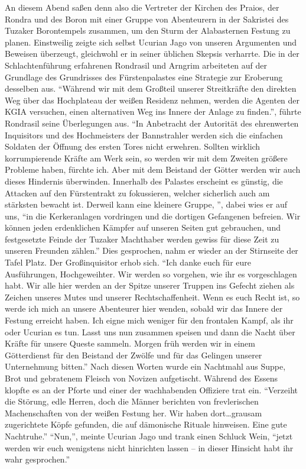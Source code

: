 An diesem Abend saßen denn also die Vertreter der Kirchen des Praios, der Rondra und des Boron mit einer Gruppe von Abenteurern in der Sakristei des Tuzaker Borontempels zusammen, um den Sturm der Alabasternen Festung zu planen. Einstweilig zeigte sich selbst Ucurian Jago von unseren Argumenten und Beweisen überzeugt, gleichwohl er in seiner üblichen Skepsis verharrte. Die in der Schlachtenführung erfahrenen Rondrasil und Arngrim arbeiteten auf der Grundlage des Grundrisses des Fürstenpalastes eine Strategie zur Eroberung desselben aus. ``Während wir mit dem Großteil unserer Streitkräfte den direkten Weg über das Hochplateau der weißen Residenz nehmen, werden die Agenten der KGIA versuchen, einen alternativen Weg ins Innere der Anlage zu finden.'', führte Rondrasil seine Überlegungen aus. ``In Anbetracht der Autorität des ehrenwerten Inquisitors und des Hochmeisters der Bannstrahler werden sich die einfachen Soldaten der Öffnung des ersten Tores nicht erwehren. Sollten wirklich korrumpierende Kräfte am Werk sein, so werden wir mit dem Zweiten größere Probleme haben, fürchte ich. Aber mit dem Beistand der Götter werden wir auch dieses Hindernis überwinden. Innerhalb des Palastes erscheint es günstig, die Attacken auf den Fürstentrakt zu fokussieren, welcher sicherlich auch am stärksten bewacht ist. Derweil kann eine kleinere Gruppe, '', dabei wies er auf uns, ``in die Kerkeranlagen vordringen und die dortigen Gefangenen befreien. Wir können jeden erdenklichen Kämpfer auf unseren Seiten gut gebrauchen, und festgesetzte Feinde der Tuzaker Machthaber werden gewiss für diese Zeit zu unseren Freunden zählen.'' Dies gesprochen, nahm er wieder an der Stirnseite der Tafel Platz. Der Großinquisitor erhob sich. ``Ich danke euch für eure Ausführungen, Hochgeweihter. Wir werden so vorgehen, wie ihr es vorgeschlagen habt. Wir alle hier werden an der Spitze unserer Truppen ins Gefecht ziehen als Zeichen unseres Mutes und unserer Rechtschaffenheit. Wenn es euch Recht ist, so werde ich mich an unsere Abenteurer hier wenden, sobald wir das Innere der Festung erreicht haben. Ich eigne mich weniger für den frontalen Kampf, als ihr oder Ucurian es tun. Lasst uns nun zusammen speisen und dann die Nacht über Kräfte für unsere Queste sammeln. Morgen früh werden wir in einem Götterdienst für den Beistand der Zwölfe und für das Gelingen unserer Unternehmung bitten.'' Nach diesen Worten wurde ein Nachtmahl aus Suppe, Brot und gebratenem Fleisch von Novizen aufgetischt. Während des Essens klopfte es an der Pforte und einer der wachhabenden Offiziere trat ein. ``Verzeiht die Störung, edle Herren, doch die Männer berichten von frevlerischen Machenschaften von der weißen Festung her. Wir haben dort\dots grausam zugerichtete Köpfe gefunden, die auf dämonische Rituale hinweisen. Eine gute Nachtruhe.'' ``Nun,'', meinte Ucurian Jago und trank einen Schluck Wein, ``jetzt werden wir euch wenigstens nicht hinrichten lassen -- in dieser Hinsicht habt ihr wahr gesprochen.''


